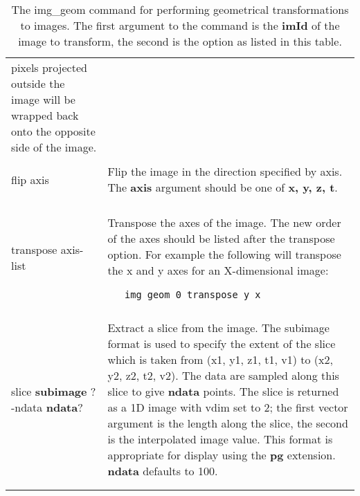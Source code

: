 \begin{table}
\begin{tabular}{|l||l|}
\begin{minipage}[t]{11.0cm}
pixels projected outside the image will be wrapped back onto the opposite
side of the image.
\end{minipage} \\
& \\
flip axis &
\begin{minipage}[t]{11.0cm}
Flip the image in the direction specified by axis.
The {\bf axis} argument should be one of {\bf x, y, z, t}.
\end{minipage} \\
& \\
transpose axis-list &
\begin{minipage}[t]{11.0cm}
Transpose the axes of the image.  The new order of the axes
should be listed after the transpose option.  For example the
following will transpose the x and y axes for an X-dimensional image:
\begin{verbatim}
   img_geom 0 transpose y x
\end{verbatim}
\end{minipage} \\
& \\
\begin{minipage}[t]{4.0cm}
\flushleft
slice {\bf subimage}
\newline
?-ndata {\bf ndata}?
\end{minipage} &
\begin{minipage}[t]{11.0cm}
Extract a slice from the image.  The subimage format is used to
specify the extent of the slice which is taken from (x1, y1, z1, t1, v1)
to (x2, y2, z2, t2, v2).  The data are sampled along this slice to
give {\bf ndata} points.  The slice is returned as a 1D image with
vdim set to 2; the first vector argument is the length along the slice,
the second is the interpolated image value.  This format is appropriate
for display using the {\bf pg} extension.  {\bf ndata} defaults to 100.
\end{minipage} \\
& \\
& \\ \hline
\end{tabular}
\caption{The img\_geom command for performing geometrical
transformations to images.  The first argument to the command is
the {\bf imId} of the image to transform, the second is the option
as listed in this table.}
\end{table}

